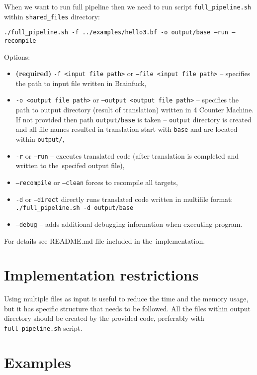 \documentclass[english,shortabstract,mgr]{iithesis}
\begin{document}
When we want to run full pipeline then we need to run script \texttt{full\_pipeline.sh} within
\texttt{shared\_files} directory:

\hspace{-1.25cm}
\texttt{./full\_pipeline.sh -f ../examples/hello3.bf -o output/base --run --recompile}

Options:
\begin{itemize}
  \item\textbf{(required)} \texttt{-f <input file path>} or \texttt{--file <input file path>} -- specifies
      the path to input file written in Brainfuck,
  \item \texttt{-o <output file path>} or \texttt{--output <output file path>} -- specifies
      the path to output directory (result of translation) written in 4 Counter Machine. If not
      provided then path \texttt{output/base} is taken -- \texttt{output} directory
      is created and all file names resulted in translation start with \texttt{base}
      and are located within \texttt{output/},
  \item \texttt{-r} or \texttt{--run} -- executes translated code (after translation is completed
      and written to the~specifed output file),
  \item \texttt{--recompile} or \texttt{--clean} forces to recompile all targets,
  \item \texttt{-d} or \texttt{--direct} directly runs translated code written
      in multifile format: \\ \texttt{./full\_pipeline.sh -d output/base}
  \item \texttt{--debug} -- adds additional debugging information when executing program.
\end{itemize}

For details see README.md file included in the~implementation.

\section{Implementation restrictions}

Using multiple files as input is useful to reduce the time and the memory
usage, but it has specific structure that needs to be followed. All the files
within output directory should be created by the provided code, preferably
with \texttt{full\_pipeline.sh} script.

\newpage
\section{Examples}
\end{document}

